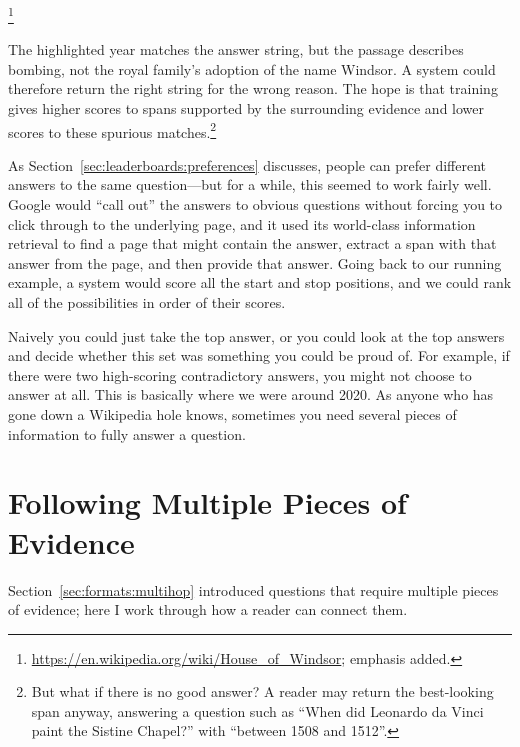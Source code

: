 \footnote{\url{https://en.wikipedia.org/wiki/House_of_Windsor}; emphasis added.}

The highlighted year matches the answer string, but the passage describes bombing, not the royal family's adoption of the name Windsor.  A system could therefore return the right string for the wrong reason.  The hope is that training gives higher scores to spans supported by the surrounding evidence and lower scores to these spurious matches.\footnote{But what if there is no good answer?  A reader may return the best-looking span anyway, answering a question such as ``When did Leonardo da Vinci paint the Sistine Chapel?'' with ``between 1508 and 1512''.}

As Section~\ref{sec:leaderboards:preferences} discusses, people can prefer different answers to the same question---but for a while, this seemed to work fairly well.  Google would ``call out'' the answers to obvious questions without forcing you to click through to the underlying page, and it used its world-class information retrieval to find a page that might contain the answer, extract a span with that answer from the page, and then provide that answer.  Going back to our running example, a system would score all the start and stop positions, and we could rank all of the possibilities in order of their scores.

Naively you could just take the top answer, or you could look at the top answers and decide whether this set was something you could be proud of.  For example, if there were two high-scoring contradictory answers, you might not choose to answer at all.  This is basically where we were around 2020.  As anyone who has gone down a Wikipedia hole knows, sometimes you need several pieces of information to fully answer a question.

\section{Following Multiple Pieces of Evidence}
\label{sec:methods:multihop}

Section~\ref{sec:formats:multihop} introduced questions that require multiple pieces of evidence; here I work through how a reader can connect them.

